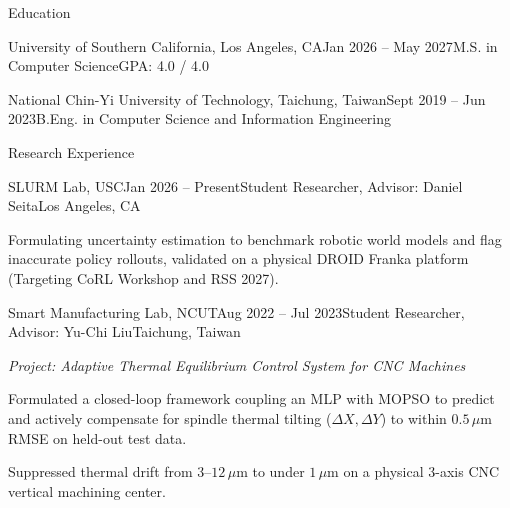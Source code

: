 \documentclass{resume}
\begin{document}
\begin{rSection}{Education}
\begin{rSubsection}{University of Southern California, {\normalfont Los Angeles, CA}}{Jan 2026 -- May 2027}{M.S. {\normalfont in Computer Science}}{GPA: 4.0 / 4.0}
\end{rSubsection}
\begin{rSubsection}{National Chin-Yi University of Technology, {\normalfont Taichung, Taiwan}}{Sept 2019 -- Jun 2023}{B.Eng. {\normalfont in Computer Science and Information Engineering}}{}
\end{rSubsection}
\end{rSection}

\begin{rSection}{Research Experience}
\begin{rSubsection}{SLURM Lab, {\normalfont USC}}{Jan 2026 -- Present}{Student Researcher,  Advisor: Daniel Seita}{Los Angeles, CA}
\item Formulating uncertainty estimation to benchmark robotic world models and flag inaccurate policy rollouts, validated on a physical DROID Franka platform (Targeting CoRL Workshop and RSS 2027).
\end{rSubsection}
\begin{rSubsection}{Smart Manufacturing Lab, {\normalfont NCUT}}{Aug 2022 -- Jul 2023}{Student Researcher,  Advisor: Yu-Chi Liu}{Taichung, Taiwan}
\item[] \textit{Project: Adaptive Thermal Equilibrium Control System for CNC Machines}
\item Formulated a closed-loop framework coupling an MLP with MOPSO to predict and actively compensate for spindle thermal tilting ($\Delta X, \Delta Y$) to within $0.5\,\mu\text{m}$ RMSE on held-out test data.
\item Suppressed thermal drift from $3\text{--}12\,\mu\text{m}$ to under $1\,\mu\text{m}$ on a physical 3-axis CNC vertical machining center.
\end{rSubsection}
\end{rSection}
\end{document}

